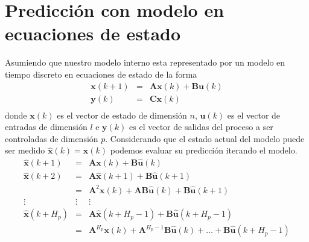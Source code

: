 \section{Predicci{\'o}n con modelo en ecuaciones de estado}\label{A_3}
Asumiendo que nuestro modelo interno esta representado por un modelo en tiempo discreto en ecuaciones de
estado de la forma
\begin{equation}
    \begin{array}{rcl}
      \mathbf{x}(k+1) & = & \mathbf{Ax}(k)+\mathbf{Bu}(k) \\
      \mathbf{y}(k)   & = & \mathbf{Cx}(k) \\
    \end{array}
\end{equation}
donde $\mathbf{x}(k)$ es el vector de estado de dimensi{\'o}n $n$, $\mathbf{u}(k)$ es el vector de entradas de
dimensi{\'o}n $l$ e $\mathbf{y}(k)$ es el vector de salidas del proceso a ser controladas de dimensi{\'o}n $p$.
Considerando que el estado actual del modelo puede ser medido $\mathbf{\hat{x}}(k)=\mathbf{x}(k)$ podemos
evaluar su predicci{\'o}n iterando el modelo.
\begin{equation}
    \begin{array}{rcl}
\mathbf{ \hat{x}}(k+1)   &   =    & \mathbf{Ax}(k)+\mathbf{B\hat{u}}(k) \\
\mathbf{ \hat{x}}(k+2)   &   =    & \mathbf{A\hat{x}}(k+1)+\mathbf{B\hat{u}}(k+1)\\
                         &   =    & \mathbf{A}^2\mathbf{x}(k)+\mathbf{AB\hat{u}}(k)+\mathbf{B\hat{u}}(k+1)  \\
     \vdots              & \vdots &  \vdots\\
 \mathbf{\hat{x}}(k+H_p) &   =    & \mathbf{A\hat{x}}(k+H_p-1)+\mathbf{B\hat{u}}(k+H_p-1)\\
                         &   =    & \mathbf{A}^{H_p}\mathbf{x}(k)+\mathbf{A}^{H_p-1}\mathbf{B\hat{u}}(k)
                                   +\ldots+\mathbf{B\hat{u}}(k+H_p-1)  \\
    \end{array}
\end{equation}

